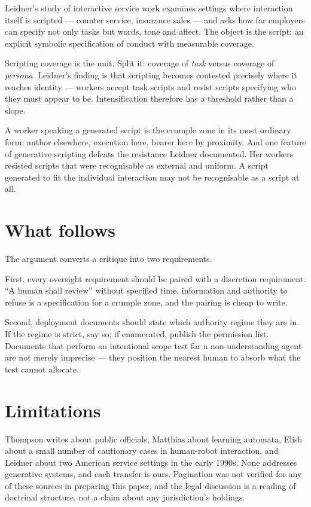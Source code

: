 \documentclass[11pt,a4paper]{article}
\begin{document}
Leidner's study of interactive service work examines settings where interaction itself is scripted --- counter service, insurance sales --- and asks how far employers can specify not only tasks but words, tone and affect. The object is the script: an explicit symbolic specification of conduct with measurable coverage.

Scripting coverage is the unit. Split it: coverage of \emph{task} versus coverage of \emph{persona}. Leidner's finding is that scripting becomes contested precisely where it reaches identity --- workers accept task scripts and resist scripts specifying who they must appear to be. Intensification therefore has a threshold rather than a slope.

A worker speaking a generated script is the crumple zone in its most ordinary form: author elsewhere, execution here, bearer here by proximity. And one feature of generative scripting defeats the resistance Leidner documented. Her workers resisted scripts that were recognisable as external and uniform. A script generated to fit the individual interaction may not be recognisable as a script at all.

\section{What follows}
The argument converts a critique into two requirements.

First, every oversight requirement should be paired with a discretion requirement. ``A human shall review'' without specified time, information and authority to refuse is a specification for a crumple zone, and the pairing is cheap to write.

Second, deployment documents should state which authority regime they are in. If the regime is strict, say so; if enumerated, publish the permission list. Documents that perform an intentional scope test for a non-understanding agent are not merely imprecise --- they position the nearest human to absorb what the test cannot allocate.

\section{Limitations}
Thompson writes about public officials, Matthias about learning automata, Elish about a small number of cautionary cases in human-robot interaction, and Leidner about two American service settings in the early 1990s. None addresses generative systems, and each transfer is ours. Pagination was not verified for any of these sources in preparing this paper, and the legal discussion is a reading of doctrinal structure, not a claim about any jurisdiction's holdings.
\end{document}
